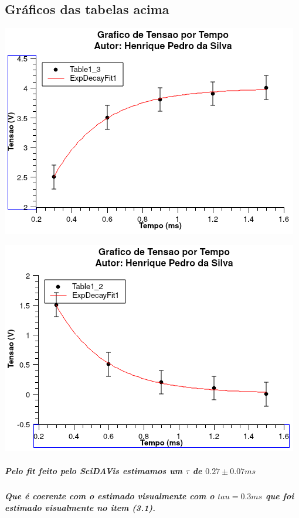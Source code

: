 \documentclass[12pt,twoside, a4paper, twocolumn]{article}
\begin{document}
\subsection{Gráficos das tabelas acima}

\begin{adjustbox}{scale=0.70}
    \includegraphics{Graph2.png}
\end{adjustbox}

\begin{adjustbox}{scale=0.70}
    \includegraphics{Graph3.png}
\end{adjustbox}

\subparagraph*{Pelo fit feito pelo SciDAVis estimamos um $\tau$ de $0.27 \pm 0.07 ms$}

\subparagraph*{Que é coerente com o estimado visualmente com o $tau = 0.3ms$ que foi estimado visualmente no item (3.1).}
\end{document}
